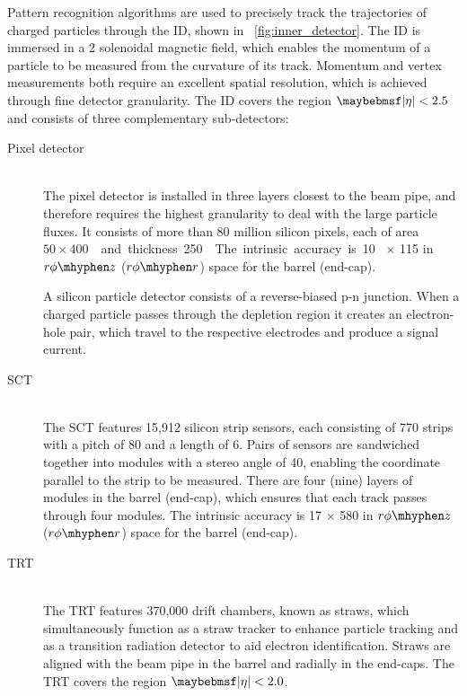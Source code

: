 Pattern recognition algorithms are used to precisely track the trajectories of charged 
particles through the \ac{ID}, shown in \Figure~\ref{fig:inner_detector}. The \ac{ID} is 
immersed in a \unit{2}{\tesla} solenoidal magnetic field, which enables the momentum of a 
particle to be measured from the curvature of its track. Momentum and vertex measurements
both require an excellent spatial resolution, which is achieved through fine detector 
granularity. The \ac{ID} covers the region $\mods{\eta} < 2.5$ and consists of three 
complementary sub-detectors:
\begin{description}
\item[Pixel detector] \hfill \\
	The pixel detector is installed in three layers closest to the beam pipe, and 
	therefore requires the highest granularity to deal with the large particle fluxes.
	It consists of more than 80 million silicon pixels, each of area 
	\unit{$50 \times 400$}{\micro\metre\squared} and thickness \unit{250}{\micro\metre}. 
	The intrinsic accuracy is \unit{10}{\micro\metre}$\,\times\,$\unit{115}{\micro\metre} 
	in $r\phi \mhyphen z$ ($r\phi \mhyphen r$) space for the barrel (end-cap).

	A silicon particle detector consists of a reverse-biased p-n junction. When a charged
	particle passes through the depletion region it creates an electron-hole pair, which 
	travel to the respective electrodes and produce a signal current.
\item[\ac{SCT}] \hfill \\
	The \ac{SCT} features 15,912 silicon strip sensors, each consisting of 770 strips 
	with a pitch of \unit{80}{\micro\metre} and a length of \unit{6}{\centi\metre}. Pairs 
	of sensors are sandwiched together into modules with a stereo angle of 
	\unit{40}{\milli\radian}, enabling the coordinate parallel to the strip to be 
	measured. There are four (nine) layers of modules in the barrel (end-cap), which 
	ensures that each track passes through four modules. 
	The intrinsic accuracy is \unit{17}{\micro\metre}$\,\times\,$\unit{580}{\micro\metre} 
	in $r\phi \mhyphen z$ ($r\phi \mhyphen r$) space for the barrel (end-cap).
\item[\ac{TRT}] \hfill \\
	The \ac{TRT} features 370,000 drift chambers, known as straws, which simultaneously 
	function as a straw tracker to enhance particle tracking and as a transition 
	radiation detector to aid electron identification. Straws are aligned with the beam 
	pipe in the barrel and radially in the end-caps. The \ac{TRT} covers the region 
	$\mods{\eta} < 2.0$.


\end{description}
